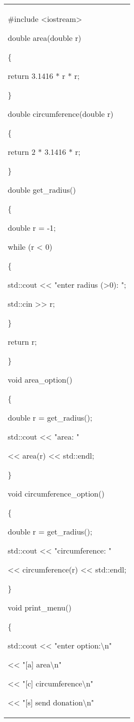 \documentclass[
]{article}
\begin{document}
\begin{longtable}[]{@{}l@{}}
\toprule
\endhead
\begin{minipage}[t]{0.97\columnwidth}\raggedright
\#include \textless iostream\textgreater{}

double area(double r)

\{

return 3.1416 * r * r;

\}

double circumference(double r)

\{

return 2 * 3.1416 * r;

\}

double get\_radius()

\{

double r = -1;

while (r \textless{} 0)

\{

std::cout \textless\textless{} "enter radius (\textgreater0): ";

std::cin \textgreater\textgreater{} r;

\}

return r;

\}

void area\_option()

\{

double r = get\_radius();

std::cout \textless\textless{} "area: "

\textless\textless{} area(r) \textless\textless{} std::endl;

\}

void circumference\_option()

\{

double r = get\_radius();

std::cout \textless\textless{} "circumference: "

\textless\textless{} circumference(r) \textless\textless{} std::endl;

\}

void print\_menu()

\{

std::cout \textless\textless{} "enter option:\textbackslash n"

\textless\textless{} "{[}a{]} area\textbackslash n"

\textless\textless{} "{[}c{]} circumference\textbackslash n"

\textless\textless{} "{[}s{]} send donation\textbackslash n"


\end{minipage}
\end{longtable}
\end{document}
